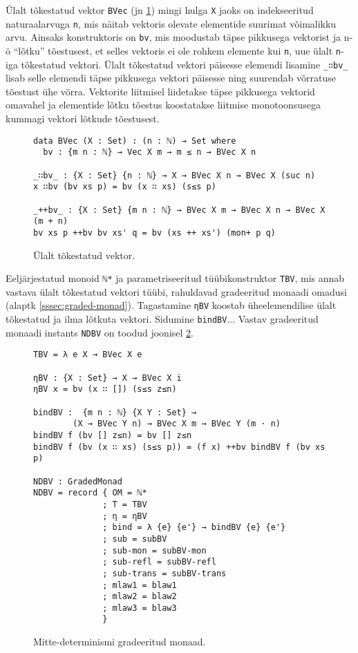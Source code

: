 \documentclass[a4paper,12pt]{article}
\begin{document}
Ülalt tõkestatud vektor {\tt BVec} (jn \ref{fig:nd.bvec}) mingi hulga {\tt X} jaoks on indekseeritud naturaalarvuga {\tt n}, mis näitab vektoris olevate elementide suurimat võimalikku arvu.
Ainsaks konstruktoris on {\tt bv}, mis moodustab täpse pikkusega vektorist ja n-ö ``lõtku'' tõestusest, et selles vektoris ei ole rohkem elemente kui {\tt n}, uue ülalt {\tt n}-iga tõkestatud vektori.
Ülalt tõkestatud vektori päisesse elemendi lisamine {\tt _∷bv_} lisab selle elemendi täpse pikkusega vektori päisesse ning suurendab võrratuse tõestust ühe võrra.
Vektorite liitmisel liidetakse täpse pikkusega vektorid omavahel ja elementide lõtku tõestus koostatakse liitmise monotoonsusega kummagi vektori lõtkude tõestusest.

\begin{figure}
  \begin{BVerbatim}
data BVec (X : Set) : (n : ℕ) → Set where
  bv : {m n : ℕ} → Vec X m → m ≤ n → BVec X n

_∷bv_ : {X : Set} {n : ℕ} → X → BVec X n → BVec X (suc n)
x ∷bv (bv xs p) = bv (x ∷ xs) (s≤s p)

_++bv_ : {X : Set} {m n : ℕ} → BVec X m → BVec X n → BVec X (m + n)
bv xs p ++bv bv xs' q = bv (xs ++ xs') (mon+ p q)    
  \end{BVerbatim}
  \caption{Ülalt tõkestatud vektor.}
  \label{fig:nd.bvec}
\end{figure}

Eeljärjestatud monoid {\tt ℕ*} ja parametriseeritud tüübikonstruktor {\tt TBV}, mis annab vastava ülalt tõkestatud vektori tüübi, rahuldavad gradeeritud monaadi omadusi (alaptk \ref{sssec:graded-monad}). Tagastamine {\tt ηBV} koostab üheelemendilise ülalt tõkestatud ja ilma lõtkuta vektori. Sidumine {\tt bindBV}...
Vastav gradeeritud monaadi instants {\tt NDBV} on toodud joonisel \ref{fig:nd.graded-monad}.

\begin{figure}
  \begin{BVerbatim}
TBV = λ e X → BVec X e

ηBV : {X : Set} → X → BVec X i
ηBV x = bv (x ∷ []) (s≤s z≤n)

bindBV :  {m n : ℕ} {X Y : Set} →
        (X → BVec Y n) → BVec X m → BVec Y (m · n)
bindBV f (bv [] z≤n) = bv [] z≤n
bindBV f (bv (x ∷ xs) (s≤s p)) = (f x) ++bv bindBV f (bv xs p)

NDBV : GradedMonad
NDBV = record { OM = ℕ*
              ; T = TBV
              ; η = ηBV
              ; bind = λ {e} {e'} → bindBV {e} {e'}
              ; sub = subBV
              ; sub-mon = subBV-mon
              ; sub-refl = subBV-refl
              ; sub-trans = subBV-trans
              ; mlaw1 = blaw1
              ; mlaw2 = blaw2
              ; mlaw3 = blaw3
              }
  \end{BVerbatim}
  \caption{Mitte-determinismi gradeeritud monaad.}
  \label{fig:nd.graded-monad}
\end{figure}
\end{document}

